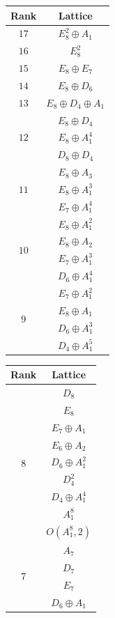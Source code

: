 \documentclass[11pt,letterpaper]{amsart}
\begin{document}
\begin{table}[H]
\centering
\begin{tabular}{ c | c } 
  Rank & Lattice\\
  \hline
  \hline
\multirow{1}{1.5em}{$17$}
&$E_8^2\oplus A_1$\\
\hline
\multirow{1}{1.5em}{$16$}
&$E_8^2$\\
\hline
\multirow{1}{1.5em}{$15$}
&$E_8\oplus E_7$\\
\hline
\multirow{1}{1.5em}{$14$} 
&$E_8\oplus D_6$ \\
  \hline
\multirow{1}{1.5em}{$13$} 
&$E_8\oplus D_4\oplus A_1$ \\
  \hline
\multirow{3}{1.5em}{$12$}
&$E_8\oplus D_4$ \\
&$E_8\oplus A_1^4$ \\
&$D_8\oplus D_4$\\
  \hline
  \multirow{3}{1.5em}{$11$}
&$E_8\oplus A_3$ \\
&$E_8\oplus A_1^3$\\
&$E_7\oplus A_1^4$\\
  \hline
\multirow{4}{1.5em}{$10$}
&$E_8\oplus A_1^2$\\
&$E_8\oplus A_2$\\
&$E_7\oplus A_1^3$\\
&$D_6\oplus A_1^4$ \\
  \hline
\multirow{4}{1.5em}{$9$} 
&$E_7\oplus A_1^2$\\
&$E_8\oplus A_1$\\
&$D_6\oplus A_1^3$\\
&$D_4\oplus A_1^5$\\
\end{tabular}
\quad
\begin{tabular}{ c | c } 
  Rank & Lattice\\
  \hline
  \hline
\multirow{9}{1.5em}{$8$} 
&$D_8$\\
&$E_8$\\
&$E_7\oplus A_1$\\
&$E_6\oplus A_2$\\
&$D_6\oplus A_1^2$\\
&$D_4^2$\\
&$D_4\oplus A_1^4$\\
&$A_1^8$\\
&$O(A_1^8,2)$\\
  \hline
\multirow{9}{1.5em}{$7$} 
&$A_7$\\
&$D_7$\\
&$E_7$\\
&$D_6\oplus A_1$\\

\end{tabular}
\end{table}
\end{document}
